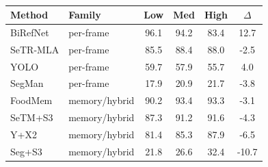 \begin{table}[htb]
\centering
\footnotesize
\caption{}
\label{tab:view_magnitude}
\begin{tabular}{llcccc}
\toprule
\textbf{Method} & \textbf{Family} & \textbf{Low} & \textbf{Med} & \textbf{High} & \textbf{$\Delta$} \\
\midrule
BiRefNet & per-frame & 96.1 & 94.2 & 83.4 & 12.7 \\
SeTR-MLA & per-frame & 85.5 & 88.4 & 88.0 & -2.5 \\
YOLO & per-frame & 59.7 & 57.9 & 55.7 & 4.0 \\
SegMan & per-frame & 17.9 & 20.9 & 21.7 & -3.8 \\
FoodMem & memory/hybrid & 90.2 & 93.4 & 93.3 & -3.1 \\
SeTM+S3 & memory/hybrid & 87.3 & 91.2 & 91.6 & -4.3 \\
Y+X2 & memory/hybrid & 81.4 & 85.3 & 87.9 & -6.5 \\
Seg+S3 & memory/hybrid & 21.8 & 26.6 & 32.4 & -10.7 \\
\bottomrule
\end{tabular}
\end{table}
